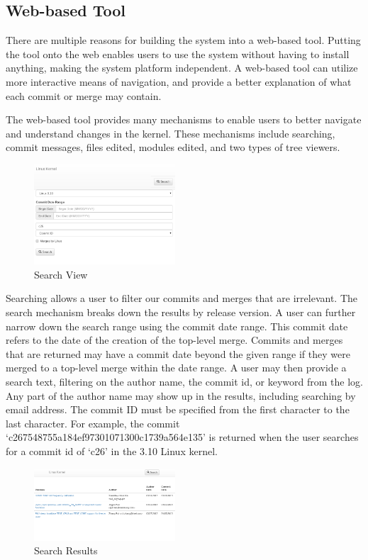 \documentclass[conference, draftclsnofoot]{IEEEtran}
\begin{document}
\subsection{Web-based Tool}

There are multiple reasons for building the system into a web-based tool.
Putting the tool onto the web enables users to use the system without having to
install anything, making the system platform independent. A web-based tool can
utilize more interactive means of navigation, and provide a better explanation
of what each commit or merge may contain.

The web-based tool provides many mechanisms to enable users to better navigate
and understand changes in the kernel. These mechanisms include searching,
commit messages, files edited, modules edited, and two types of tree viewers.

\begin{figure}[h]
	\centering
	\includegraphics[width=0.47\textwidth]{figures/search.png}
	\caption{Search View}
	\label{fig:search}
\end{figure}

Searching allows a user to filter our commits and merges that are irrelevant.
The search mechanism breaks down the results by release version. A user can
further narrow down the search range using the commit date range. This commit
date refers to the date of the creation of the top-level merge. Commits and
merges that are returned may have a commit date beyond the given range if they
were merged to a top-level merge within the date range. A user may then provide
a search text, filtering on the author name, the commit id, or keyword from the
log. Any part of the author name may show up in the results, including
searching by email address. The commit ID must be specified from the first
character to the last character. For example, the commit
`c267548755a184ef97301071300c1739a564e135' is returned when the user searches
for a commit id of `c26' in the 3.10 Linux kernel.

\begin{figure}[h]
	\centering
	\includegraphics[width=0.47\textwidth]{figures/search_results.png}
	\caption{Search Results}
	\label{fig:results}
\end{figure}
\end{document}
